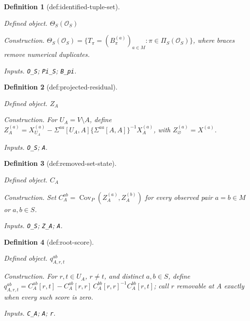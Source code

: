 \documentclass{article}
\newtheorem{definition}{Definition}
\begin{document}
\begin{definition}[def:identified-tuple-set]\label{def:identified-tuple-set}
\par\smallskip\noindent\emph{Defined object.} \(\Theta_S(\mathcal O_S)\)
\par\smallskip\noindent\emph{Construction.} \(\Theta_S(\mathcal O_S)=\{T_\pi=(B_\pi^{(a)})_{a\in M}:\pi\in\Pi_S(\mathcal O_S)\}\), where braces remove numerical duplicates.
\par\smallskip\noindent\emph{Inputs.} \texttt{O\_\allowbreak{}S}; \texttt{Pi\_\allowbreak{}S}; \texttt{B\_\allowbreak{}pi}.
\end{definition}

\begin{definition}[def:projected-residual]\label{def:projected-residual}
\par\smallskip\noindent\emph{Defined object.} \(Z_A\)
\par\smallskip\noindent\emph{Construction.} For \(U_A=V\setminus A\), define \(Z_A^{(a)}=X_{U_A}^{(a)}-\Sigma^{aa}[U_A,A]\{\Sigma^{aa}[A,A]\}^{-1}X_A^{(a)}\), with \(Z_\varnothing^{(a)}=X^{(a)}\).
\par\smallskip\noindent\emph{Inputs.} \texttt{O\_\allowbreak{}S}; \texttt{A}.
\end{definition}

\begin{definition}[def:removed-set-state]\label{def:removed-set-state}
\par\smallskip\noindent\emph{Defined object.} \(C_A\)
\par\smallskip\noindent\emph{Construction.} Set \(C_A^{ab}=\operatorname{Cov}_P(Z_A^{(a)},Z_A^{(b)})\) for every observed pair \(a=b\in M\) or \(a,b\in S\).
\par\smallskip\noindent\emph{Inputs.} \texttt{O\_\allowbreak{}S}; \texttt{Z\_\allowbreak{}A}; \texttt{A}.
\end{definition}

\begin{definition}[def:root-score]\label{def:root-score}
\par\smallskip\noindent\emph{Defined object.} \(q_{A,r,t}^{ab}\)
\par\smallskip\noindent\emph{Construction.} For \(r,t\in U_A\), \(r\ne t\), and distinct \(a,b\in S\), define \(q_{A,r,t}^{ab}=C_A^{ab}[r,t]-C_A^{ab}[r,r]\,C_A^{bb}[r,r]^{-1}C_A^{bb}[r,t]\); call \(r\) removable at \(A\) exactly when every such score is zero.
\par\smallskip\noindent\emph{Inputs.} \texttt{C\_\allowbreak{}A}; \texttt{A}; \texttt{r}.
\end{definition}
\end{document}
